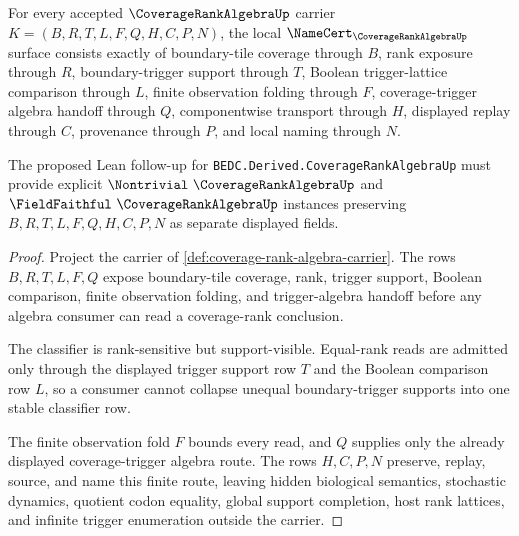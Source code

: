 \begin{theorem}
\label{thm:coverage-rank-algebra-namecert-obligations}
For every accepted $\CoverageRankAlgebraUp$ carrier $K=(B,R,T,L,F,Q,H,C,P,N)$, the local $\NameCert_{\CoverageRankAlgebraUp}$ surface consists exactly of boundary-tile coverage through $B$, rank exposure through $R$, boundary-trigger support through $T$, Boolean trigger-lattice comparison through $L$, finite observation folding through $F$, coverage-trigger algebra handoff through $Q$, componentwise transport through $H$, displayed replay through $C$, provenance through $P$, and local naming through $N$.

The proposed Lean follow-up for \texttt{BEDC.Derived.CoverageRankAlgebraUp} must provide explicit $\Nontrivial\ \CoverageRankAlgebraUp$ and $\FieldFaithful\ \CoverageRankAlgebraUp$ instances preserving $B,R,T,L,F,Q,H,C,P,N$ as separate displayed fields.
\end{theorem}
\begin{proof}
Project the carrier of \autoref{def:coverage-rank-algebra-carrier}. The rows $B,R,T,L,F,Q$ expose boundary-tile coverage, rank, trigger support, Boolean comparison, finite observation folding, and trigger-algebra handoff before any algebra consumer can read a coverage-rank conclusion.

The classifier is rank-sensitive but support-visible. Equal-rank reads are admitted only through the displayed trigger support row $T$ and the Boolean comparison row $L$, so a consumer cannot collapse unequal boundary-trigger supports into one stable classifier row.

The finite observation fold $F$ bounds every read, and $Q$ supplies only the already displayed coverage-trigger algebra route. The rows $H,C,P,N$ preserve, replay, source, and name this finite route, leaving hidden biological semantics, stochastic dynamics, quotient codon equality, global support completion, host rank lattices, and infinite trigger enumeration outside the carrier.
\end{proof}

